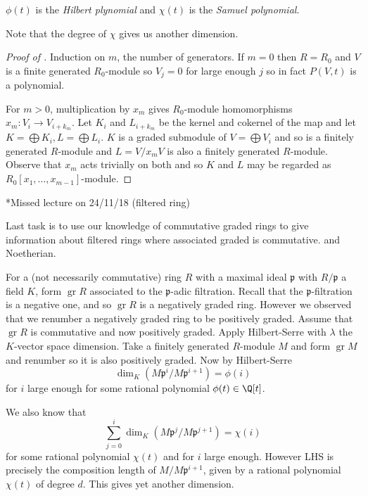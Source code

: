 \documentclass[a4paper]{article}
\DeclareMathOperator{\gr}{gr}
\begin{document}
\begin{definition}
  \(\phi(t)\) is the \emph{Hilbert plynomial} and \(\chi(t)\) is the \emph{Samuel polynomial}.
\end{definition}

Note that the degree of \(\chi\) gives us another dimension.

\begin{proof}[Proof of ]
  Induction on \(m\), the number of generators. If \(m = 0\) then \(R = R_0\) and \(V\) is a finite generated \(R_0\)-module so \(V_j = 0\) for large enough \(j\) so in fact \(P(V, t)\) is a polynomial.

  For \(m > 0\), multiplication by \(x_m\) gives \(R_0\)-module homomorphisms \(x_m: V_i \to V_{i + k_m}\). Let \(K_i\) and \(L_{i + k_m}\) be the kernel and cokernel of the map and let \(K = \bigoplus K_i, L = \bigoplus L_i\). \(K\) is a graded submodule of \(V = \bigoplus V_i\) and so is a finitely generated \(R\)-module and \(L = V/x_mV\) is also a finitely generated \(R\)-module. Observe that \(x_m\) acts trivially on both and so \(K\) and \(L\) may be regarded as \(R_0[x_1, \dots, x_{m - 1}]\)-module.
\end{proof}

*Missed lecture on 24/11/18 (filtered ring)

Last task is to use our knowledge of commutative graded rings to give information about filtered rings where associated graded is commutative. and Noetherian.

For a (not necessarily commutative) ring \(R\) with a maximal ideal \(\mathfrak p\) with \(R/\mathfrak p\) a field \(K\), form \(\gr R\) associated to the \(\mathfrak p\)-adic filtration. Recall that the \(\mathfrak p\)-filtration is a negative one, and so \(\gr R\) is a negatively graded ring. However we observed that we renumber a negatively graded ring to be positively graded. Assume that \(\gr R\) is commutative and now positively graded. Apply Hilbert-Serre with \(\lambda\) the \(K\)-vector space dimension. Take a finitely generated \(R\)-module \(M\) and form \(\gr M\) and renumber so it is also positively graded. Now by Hilbert-Serre
\[
  \dim_K(M \mathfrak p^i/M \mathfrak p^{i + 1}) = \phi(i)
\]
for \(i\) large enough for some rational polynomial \(\phi(t) \in \Q[t]\).

We also know that
\[
  \sum_{j = 0}^i \dim_K (M \mathfrak p^j/M \mathfrak p^{j + 1}) = \chi(i)
\]
for some rational polynomial \(\chi(t)\) and for \(i\) large enough. However LHS is precisely the composition length of \(M /M \mathfrak p^{i + 1}\), given by a rational polynomial \(\chi(t)\) of degree \(d\). This gives yet another dimension.
\end{document}
